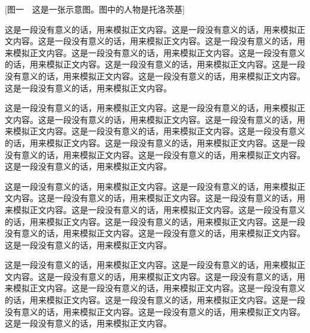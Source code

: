 [图一　这是一张示意图。图中的人物是托洛茨基]

这是一段没有意义的话，用来模拟正文内容。这是一段没有意义的话，用来模拟正文内容。这是一段没有意义的话，用来模拟正文内容。这是一段没有意义的话，用来模拟正文内容。这是一段没有意义的话，用来模拟正文内容。这是一段没有意义的话，用来模拟正文内容。这是一段没有意义的话，用来模拟正文内容。这是一段没有意义的话，用来模拟正文内容。这是一段没有意义的话，用来模拟正文内容。这是一段没有意义的话，用来模拟正文内容。


\hr{}

这是一段没有意义的话，用来模拟正文内容。这是一段没有意义的话，用来模拟正文内容。这是一段没有意义的话，用来模拟正文内容。这是一段没有意义的话，用来模拟正文内容。这是一段没有意义的话，用来模拟正文内容。这是一段没有意义的话，用来模拟正文内容。这是一段没有意义的话，用来模拟正文内容。这是一段没有意义的话，用来模拟正文内容。这是一段没有意义的话，用来模拟正文内容。这是一段没有意义的话，用来模拟正文内容。

这是一段没有意义的话，用来模拟正文内容。这是一段没有意义的话，用来模拟正文内容。这是一段没有意义的话，用来模拟正文内容。这是一段没有意义的话，用来模拟正文内容。这是一段没有意义的话，用来模拟正文内容。这是一段没有意义的话，用来模拟正文内容。这是一段没有意义的话，用来模拟正文内容。这是一段没有意义的话，用来模拟正文内容。这是一段没有意义的话，用来模拟正文内容。这是一段没有意义的话，用来模拟正文内容。

\todo{}

这是一段没有意义的话，用来模拟正文内容。这是一段没有意义的话，用来模拟正文内容。这是一段没有意义的话，用来模拟正文内容。这是一段没有意义的话，用来模拟正文内容。这是一段没有意义的话，用来模拟正文内容。这是一段没有意义的话，用来模拟正文内容。这是一段没有意义的话，用来模拟正文内容。这是一段没有意义的话，用来模拟正文内容。这是一段没有意义的话，用来模拟正文内容。这是一段没有意义的话，用来模拟正文内容。

